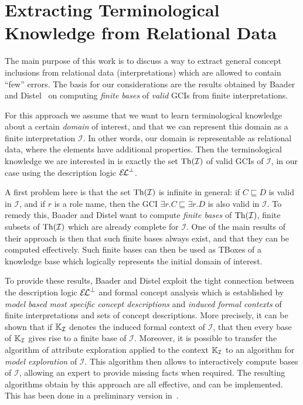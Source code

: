 \section{Extracting Terminological Knowledge from Relational Data}
\label{sec:extr-term-knowl}

The main purpose of this work is to discuss a way to extract general concept inclusions
from relational data (interpretations) which are allowed to contain \enquote{few} errors.
The basis for our considerations are the results obtained by Baader and
Distel~\cite{Diss-Felix,BaDi09,BaaderDistel08} on computing \emph{finite bases} of
\emph{valid} GCIs from finite interpretations.

For this approach we assume that we want to learn terminological knowledge about a certain
\emph{domain} of interest, and that we can represent this domain as a finite
interpretation $\mathcal{I}$.  In other words, our domain is representable as relational
data, where the elements have additional properties.  Then the terminological knowledge we
are interested in is exactly the set $\operatorname{Th}(\mathcal{I})$ of valid GCIs of $\mathcal{I}$, in
our case using the description logic ${{\mathcal{E}\kern-.3ex\mathcal{L}}^\bot}$.

A first problem here is that the set $\operatorname{Th}(\mathcal{I})$ is infinite in general: if $C
\sqsubseteq D$ is valid in $\mathcal{I}$, and if $r$ is a role name, then the GCI
$\exists r. C \sqsubseteq \exists r. D$ is also valid in $\mathcal{I}$.  To remedy this,
Baader and Distel want to compute \emph{finite bases} of $\operatorname{Th}(\mathcal{I})$, \ie finite
subsets of $\operatorname{Th}(\mathcal{I})$ which are already complete for $\mathcal{I}$.  One of the
main results of their approach is then that such finite bases always exist, and that they
can be computed effectively.  Such finite bases can then be used as TBoxes of a knowledge
base which logically represents the initial domain of interest.

To provide these results, Baader and Distel exploit the tight connection between the
description logic ${{\mathcal{E}\kern-.3ex\mathcal{L}}^\bot}$ and formal concept analysis which is established by \emph{model
  based most specific concept descriptions} and \emph{induced formal contexts} of finite
interpretations and sets of concept descriptions.  More precisely, it can be shown that if
${\mathbb{K}}_{\mathcal{I}}$ denotes the induced formal context of $\mathcal{I}$, that then
every base of ${\mathbb{K}}_{\mathcal{I}}$ gives rise to a finite base of $\mathcal{I}$.
Moreover, it is possible to transfer the algorithm of attribute exploration applied to the
context ${\mathbb{K}}_{\mathcal{I}}$ to an algorithm for \emph{model exploration} of
$\mathcal{I}$.  This algorithm then allows to interactively compute bases of
$\mathcal{I}$, allowing an expert to provide missing facts when required.  The resulting
algorithms obtain by this approach are all effective, and can be implemented.  This has
been done in a preliminary version in~\cite{DBLP:conf/icdm/BorchmannD11}.

